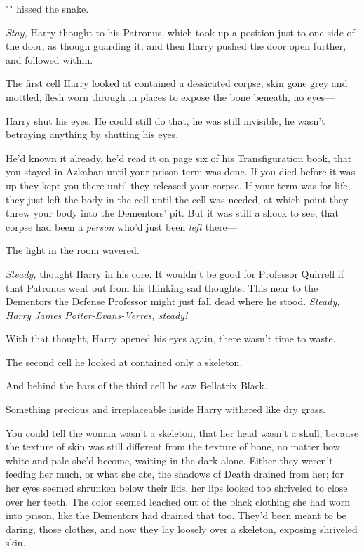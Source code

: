 "" hissed the snake.

\emph{Stay,} Harry thought to his Patronus, which took up a position just to
one side of the door, as though guarding it; and then Harry pushed the door
open further, and followed within.

The first cell Harry looked at contained a dessicated corpse, skin gone grey
and mottled, flesh worn through in places to expose the bone beneath, no eyes—

Harry shut his eyes. He could still do that, he was still invisible, he wasn't
betraying anything by shutting his eyes.

He'd known it already, he'd read it on page six of his Transfiguration book,
that you stayed in Azkaban until your prison term was done. If you died before
it was up they kept you there until they released your corpse. If your term was
for life, they just left the body in the cell until the cell was needed, at
which point they threw your body into the Dementors' pit. But it was still a
shock to see, that corpse had been a \emph{person} who'd just been \emph{left}
there—

The light in the room wavered.

\emph{Steady,} thought Harry in his core. It wouldn't be good for Professor
Quirrell if that Patronus went out from his thinking sad thoughts. This near to
the Dementors the Defense Professor might just fall dead where he stood.
\emph{Steady, Harry James Potter-Evans-Verres, steady!}

With that thought, Harry opened his eyes again, there wasn't time to waste.

The second cell he looked at contained only a skeleton.

And behind the bars of the third cell he saw Bellatrix Black.

Something precious and irreplaceable inside Harry withered like dry grass.

You could tell the woman wasn't a skeleton, that her head wasn't a skull,
because the texture of skin was still different from the texture of bone, no
matter how white and pale she'd become, waiting in the dark alone. Either they
weren't feeding her much, or what she ate, the shadows of Death drained from
her; for her eyes seemed shrunken below their lids, her lips looked too
shriveled to close over her teeth. The color seemed leached out of the black
clothing she had worn into prison, like the Dementors had drained that too.
They'd been meant to be daring, those clothes, and now they lay loosely over a
skeleton, exposing shriveled skin.

